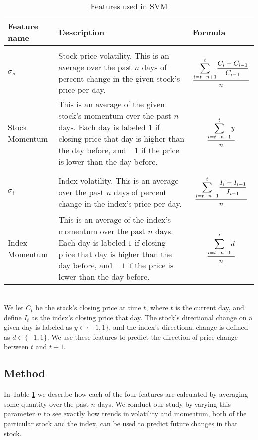 \documentclass[pageno]{jpaper}
\begin{document}
\begin{table}[b]
\caption{Features used in SVM} \label{table: features}
\small
\begin{tabular}{p{3cm} p{6cm} p{6cm}}
\hline
Feature name & Description & Formula \\
\hline \\
$ \sigma_s$ & Stock price volatility. This is an average over the past $n$ days of percent change in the given stock's price per day. & $$\dfrac{\mathlarger{\sum}_{i=t-n+1}^t \dfrac{C_i - C_{i-1}}{C_{i-1}}}{n}$$ \\
Stock Momentum & This is an average of the given stock's momentum over the past $n$ days. Each day is labeled $1$ if closing price that day is higher than the day before, and $-1$ if the price is lower than the day before. & $$\dfrac{\mathlarger{\sum}_{i=t-n+1}^t y}{n}$$ \\ \\
$\sigma_i$ & Index volatility. This is an average over the past $n$ days of percent change in the index's price per day. & $$\dfrac{\mathlarger{\sum}_{i=t-n+1}^t \dfrac{I_i - I_{i-1}}{I_{i-1}}}{n}$$ \\ 
Index Momentum & This is an average of the index's momentum over the past $n$ days. Each day is labeled $1$ if closing price that day is higher than the day before, and $-1$ if the price is lower than the day before. & $$\dfrac{\mathlarger{\sum}_{i=t-n+1}^t d}{n}$$ \\ \hline
\end{tabular}
\footnotesize
\\We let $C_t$ be the stock's closing price at time $t$, where $t$ is the current day, and define $I_t$ as the index's closing price that day. The stock's directional change on a given day is labeled as $y \in \{-1, 1\}$, and the index's directional change is defined as $d \in \{-1, 1\}$. We use these features to predict the direction of price change between $t$ and $t+1$.
\end{table}
\medskip

\subsection{Method}
In Table \ref{table: features} we describe how each of the four features are calculated by averaging some quantity over the past $n$ days. We conduct our study by varying this parameter $n$ to see exactly how trends in volatility and momentum, both of the particular stock and the index, can be used to predict future changes in that stock.
\end{document}
